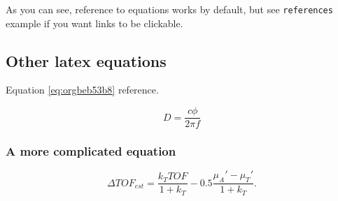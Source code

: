 As you can see, reference to equations works by default, but see \texttt{references}
example if you want links to be clickable.

\subsection{Other latex equations}
\label{sec:org1e44002}
Equation \ref{eq:orgbeb53b8} reference.

\begin{equation}
\label{eq:orgbeb53b8}
D = \frac{c\phi}{2\pi f}
\end{equation}

\subsubsection{A more complicated equation}
\label{sec:org7b6a2a6}

\begin{equation}
\Delta TOF_{est} = \frac{k_T TOF}{1+k_T } - 0.5 \frac{\mu_A' - \mu_T'}{1+k_T}.
\end{equation}


